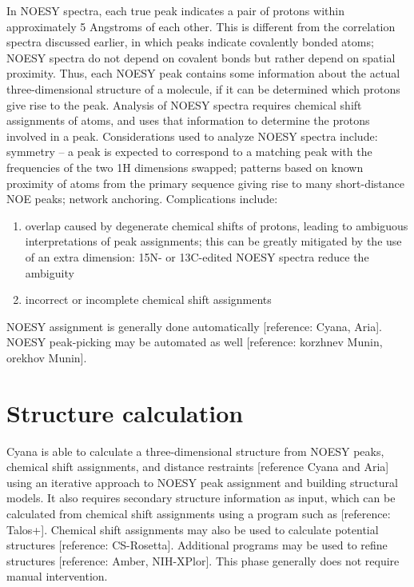 In NOESY spectra, each true peak indicates a pair of protons within 
approximately 5 Angstroms of each other.  This is different from the 
correlation spectra discussed earlier, in which peaks indicate covalently 
bonded atoms; NOESY spectra do not depend on covalent bonds but rather 
depend on spatial proximity.  Thus, each NOESY peak contains some information 
about the actual three-dimensional structure of a molecule, if it can be 
determined which protons give rise to the peak.  Analysis of NOESY spectra 
requires chemical shift assignments of atoms, and uses that information to 
determine the protons involved in a peak.  Considerations used to analyze 
NOESY spectra include: symmetry -- a peak is expected to correspond to a 
matching peak with the frequencies of the two 1H dimensions swapped; patterns 
based on known proximity of atoms from the primary sequence giving rise to 
many short-distance NOE peaks; network anchoring.  Complications include: 
\begin{enumerate}
  \item overlap caused by degenerate chemical shifts of protons, leading to 
ambiguous interpretations of peak assignments; this can be greatly mitigated 
by the use of an extra dimension:  15N- or 13C-edited NOESY spectra reduce 
the ambiguity
  \item incorrect or incomplete chemical shift assignments
\end{enumerate}

NOESY assignment is generally done automatically [reference: Cyana, Aria].  
NOESY peak-picking may be automated as well [reference: korzhnev Munin, orekhov Munin].


\section{Structure calculation}

Cyana is able to calculate a three-dimensional structure from NOESY peaks, 
chemical shift assignments, and distance restraints  [reference Cyana and Aria] 
using an iterative approach to NOESY peak assignment and building structural 
models.  It also requires secondary structure information as input, which can 
be calculated from chemical shift assignments using a program such as 
[reference: Talos+].  Chemical shift assignments may also be used to 
calculate potential structures [reference: CS-Rosetta].  Additional programs 
may be used to refine structures [reference: Amber, NIH-XPlor].  This phase 
generally does not require manual intervention.


